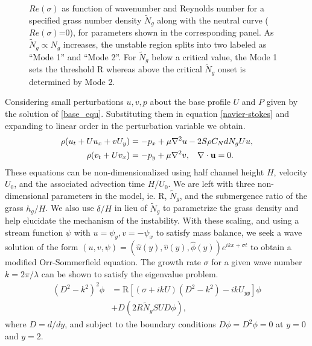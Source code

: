\documentclass[aps,prl,twocolumn,superscriptaddress,10pt]{revtex4-1}  %
\newcommand{\bu}{\mathbf{u}}
\newcommand{\Rey}{\text{R}}
\newcommand{\Ndg}{\tilde{N}_g}
\begin{document}
\begin{figure}
\begin{tabular}{cccc}
\end{tabular}
\caption{$Re(\sigma)$ as function of wavenumber and Reynolds number for a specified grass number density $\Ndg$ along with the neutral curve ($Re(\sigma)$=0), for parameters shown in the corresponding panel.  
As $\Ndg \propto N_g$ increases, the unstable region splits into two labeled as ``Mode 1'' and ``Mode 2''. 
For $\Ndg$ below a critical value, the Mode 1 sets the threshold $\Rey$ whereas above the critical $\Ndg$ onset is determined by Mode 2.}
\label{K_Re_sigma_set3}
\end{figure}

Considering small perturbations $u, v, p$ about the base profile $U$ and $P$ given by the solution of \eqref{base_equ}. Substituting them in equation \eqref{navier-stokes} and expanding  to linear order in the perturbation variable we obtain.
\begin{equation}
\begin{split}
\rho(u_t+U u_x+vU_y) &= -p_x+ {\mu}\nabla^2u-2S\rho C_{N}dN_{g}Uu, \\
\rho(v_t+ Uv_x) &= -p_y+ {\mu}\nabla^2v, \hspace{0.3cm} \nabla\cdot\bu=0.
\end{split}
\end{equation}
These equations can be non-dimensionalized using half channel height $H$, velocity $U_0$, and the associated advection time $H/U_0$. 
We are left with three non-dimensional parameters in the model, ie. $\Rey$, $\Ndg$, and the submergence ratio of the grass $h_g/H$. 
We also use $\delta/H$ in lieu of $\Ndg$ to parametrize the grass density and help elucidate the mechanism of the instability. 
With these scaling, and using a stream function $\psi$ with $u = \psi_{y}, v= -\psi_x$ to satisfy mass balance, we seek a wave solution of 
the form $\left(u,v,\psi \right)= \left(\hat u(y), \hat v(y), \hat\phi(y) \right)e^{ikx+\sigma t}$ to  obtain a modified Orr-Sommerfield equation. 
The growth rate $\sigma$ for a given wave number $k=2\pi /\lambda$ can be shown to satisfy the eigenvalue problem.
\begin{equation}
\begin{split}
\left(D^2 -k^{2} \right)^2\phi &= \Rey \left[ \left({\sigma}+ikU\right) \left(D^2-k^2\right) -ikU_{yy}\right]\phi \\
&+D\left(2R \Ndg S U D \phi\right),
\label{Orr-somerfield}
\end{split}
\end{equation}
where $D=d/dy$, and subject to the boundary conditions $D\phi = D^2\phi = 0$ at $y=0$ and $y=2$. 
\end{document}
